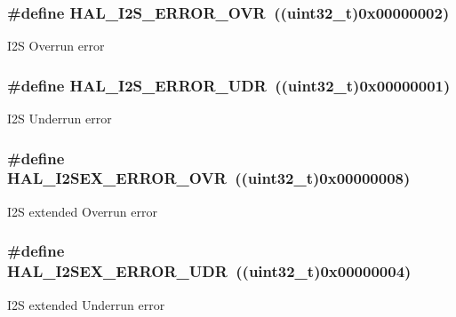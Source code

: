 \subsubsection[{\texorpdfstring{H\+A\+L\+\_\+\+I2\+S\+\_\+\+E\+R\+R\+O\+R\+\_\+\+O\+VR}{HAL_I2S_ERROR_OVR}}]{\setlength{\rightskip}{0pt plus 5cm}\#define H\+A\+L\+\_\+\+I2\+S\+\_\+\+E\+R\+R\+O\+R\+\_\+\+O\+VR~((uint32\+\_\+t)0x00000002)}\hypertarget{group___i2_s___error___code_gad8e43b3c6ff9233ea7c233f414bd2201}{}\label{group___i2_s___error___code_gad8e43b3c6ff9233ea7c233f414bd2201}
I2S Overrun error 
\subsubsection[{\texorpdfstring{H\+A\+L\+\_\+\+I2\+S\+\_\+\+E\+R\+R\+O\+R\+\_\+\+U\+DR}{HAL_I2S_ERROR_UDR}}]{\setlength{\rightskip}{0pt plus 5cm}\#define H\+A\+L\+\_\+\+I2\+S\+\_\+\+E\+R\+R\+O\+R\+\_\+\+U\+DR~((uint32\+\_\+t)0x00000001)}\hypertarget{group___i2_s___error___code_ga1c4ae6b04b16718ed666cf46d14bf19e}{}\label{group___i2_s___error___code_ga1c4ae6b04b16718ed666cf46d14bf19e}
I2S Underrun error 
\subsubsection[{\texorpdfstring{H\+A\+L\+\_\+\+I2\+S\+E\+X\+\_\+\+E\+R\+R\+O\+R\+\_\+\+O\+VR}{HAL_I2SEX_ERROR_OVR}}]{\setlength{\rightskip}{0pt plus 5cm}\#define H\+A\+L\+\_\+\+I2\+S\+E\+X\+\_\+\+E\+R\+R\+O\+R\+\_\+\+O\+VR~((uint32\+\_\+t)0x00000008)}\hypertarget{group___i2_s___error___code_ga09abad1fb22c286494ead507e6ccaaa5}{}\label{group___i2_s___error___code_ga09abad1fb22c286494ead507e6ccaaa5}
I2S extended Overrun error 
\subsubsection[{\texorpdfstring{H\+A\+L\+\_\+\+I2\+S\+E\+X\+\_\+\+E\+R\+R\+O\+R\+\_\+\+U\+DR}{HAL_I2SEX_ERROR_UDR}}]{\setlength{\rightskip}{0pt plus 5cm}\#define H\+A\+L\+\_\+\+I2\+S\+E\+X\+\_\+\+E\+R\+R\+O\+R\+\_\+\+U\+DR~((uint32\+\_\+t)0x00000004)}\hypertarget{group___i2_s___error___code_ga0e1bf324ee34f7effa24848c8433c497}{}\label{group___i2_s___error___code_ga0e1bf324ee34f7effa24848c8433c497}
I2S extended Underrun error 